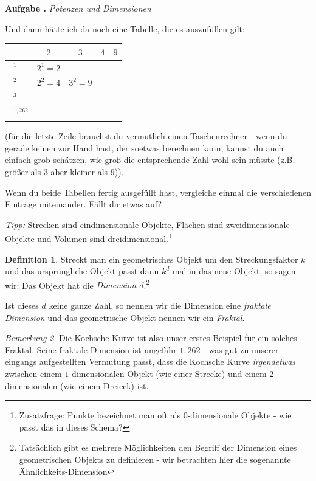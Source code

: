\documentclass[a4paper,ngerman,12pt]{scrartcl}
\theoremstyle{definition}
\newtheorem{defn}{Definition}[]
\theoremstyle{plain}
\theoremstyle{remark}
\newtheorem{bem}[defn]{Bemerkung}
\newlength{\aufgabenskip}
\newcounter{aufgabennummer}
\newenvironment{aufgabe}[1]{
  \addtocounter{aufgabennummer}{1}
  \textbf{Aufgabe \theaufgabennummer.} \emph{#1} \par
}{\vspace{\aufgabenskip}}
\begin{document}
\newpage

\begin{aufgabe}{Potenzen und Dimensionen}
Und dann hätte ich da noch eine Tabelle, die es auszufüllen gilt:
\begin{center}
	\renewcommand{\arraystretch}{2}
	\begin{tabular}{l||c|c|c|c}
				      & $2$ & $3$ & $4$ & $9$ \\\hline\hline
		$\boxed{\phantom{1}}^1$  & $2^1=2$	&   &  & \\\hline
		$\boxed{\phantom{1}}^2$  & $2^2=4$	& $3^2=9$ & \phantom{$4^2=16$} & \phantom{$9^2=81$}\\\hline
		$\boxed{\phantom{1}}^3$  & 	&   &  & \\\hline
		$\boxed{\phantom{1}}^{1,262}$  & 	&   &  &     	
	\end{tabular}
\end{center}
(für die letzte Zeile brauchst du vermutlich einen Taschenrechner - wenn du gerade keinen zur Hand hast, der soetwas berechnen kann, kannst du auch einfach grob schätzen, wie groß die entsprechende Zahl wohl sein müsste (z.B. größer als $3$ aber kleiner als $9$)).

Wenn du beide Tabellen fertig ausgefüllt hast, vergleiche einmal die verschiedenen Einträge miteinander. Fällt dir etwas auf?

\emph{Tipp:} Strecken sind eindimensionale Objekte, Flächen sind zweidimensionale Objekte und Volumen sind dreidimensional.\footnote{Zusatzfrage: Punkte bezeichnet man oft als 0-dimensionale Objekte - wie passt das in dieses Schema?}
\end{aufgabe}

\begin{defn}
Streckt man ein geometrisches Objekt um den Streckungsfaktor $k$ und das ursprüngliche Objekt passt dann $k^d$-mal in das neue Objekt, so sagen wir: Das Objekt hat die \emph{Dimension $d$}.\footnote{Tatsächlich gibt es mehrere Möglichkeiten den Begriff der Dimension eines geometrischen Objekts zu definieren - wir betrachten hier die sogenannte \glqq Ähnlichkeits-Dimension\grqq{}}

Ist dieses $d$ keine ganze Zahl, so nennen wir die Dimension eine \emph{fraktale Dimension} und das geometrische Objekt nennen wir ein \emph{Fraktal}.
\end{defn}

\begin{bem}
Die Kochsche Kurve ist also unser erstes Beispiel für ein solches Fraktal. Seine fraktale Dimension ist ungefähr $1,262$ - was gut zu unserer eingangs aufgestellten Vermutung passt, dass die Kochsche Kurve \emph{irgendetwas} zwischen einem $1$-dimensionalen Objekt (wie einer Strecke) und einem 2-dimensionalen (wie einem Dreieck) ist.
\end{bem}
\end{document}
